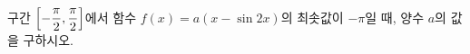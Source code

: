 구간 $\left[-\dfrac{\pi}{2}{,}\mkern3mu\mathopen{}\dfrac{\pi}{2}\right]$에서 함수 $f(x)=a(x-\sin 2x)$의 최솟값이 $-\pi$일 때, 양수 $a$의 값을 구하시오.
